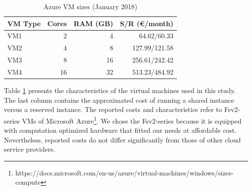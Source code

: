 {\begin{table}[ht]
  \centering
    \caption{Azure VM sizes (January 2018)}
  \begin{tabular}{@{}lrrr@{}} \toprule
  VM Type & Cores & RAM (GB) & S/R (\euro/month)\\
    \midrule
  VM1 & 2 & 4 & 64.62/60.33\\
  VM2 & 4 & 8 & 127.99/121.58\\
  VM3 & 8 & 16 & 256.61/242.42\\
  VM4 & 16 & 32 & 513.23/484.92\\
    \bottomrule
  \end{tabular}
    \label{tab:sizes}
\end{table}

Table \ref{tab:sizes} presents the characteristics of the virtual machines used in this study. The last column contains the approximated cost of running a shared instance versus a reserved instance. 
The reported costs and characteristics refer to Fsv2-series VMs of Microsoft Azure\footnote{https://docs.microsoft.com/en-us/azure/virtual-machines/windows/sizes-compute}. We chose the Fsv2-series because it is equipped with computation optimized hardware that fitted our needs at affordable cost.
Nevertheless, reported costs do not differ significantly from those of other cloud service providers. 

%
%
%

}
